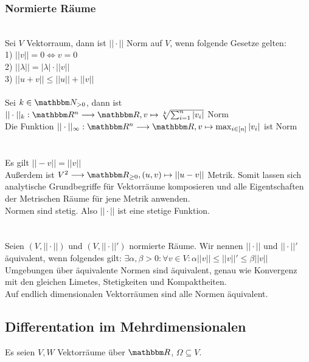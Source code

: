 \subsubsection*{Normierte Räume}
 \\
Sei \(V\) Vektorraum, dann ist \(||\cdot||\) Norm auf \(V\), wenn folgende Gesetze gelten:\\
1) \(||v|| = 0 \Longleftrightarrow v = 0\) \\
2) \(||\lambda|| = |\lambda| \cdot ||v||\) \\
3) \(||u+v|| \le ||u|| + ||v||\) \pagebreak \\
 \\
Sei \(k \in \N_{> 0}\), dann ist \(||\cdot||_k : \R^n \longrightarrow \R, v \mapsto \sqrt[k]{\sum_{i=1}^{n}|v_i|}\) Norm \\
Die Funktion \(||\cdot||_\infty : \R^n \longrightarrow \R, v \mapsto \max_{i \in [n]}|v_i|\) ist Norm \\ \\
 \\
Es gilt \(||-v|| = ||v||\) \\
Außerdem ist \(V^2 \longrightarrow \R_{\ge 0}, (u,v) \mapsto ||u-v||\) Metrik. Somit lassen sich analytische Grundbegriffe für Vektorräume komposieren und alle Eigentschaften der Metrischen Räume für jene Metrik anwenden. \\
Normen sind stetig. Also \(||\cdot||\) ist eine stetige Funktion. \\ \\
 \\
Seien \((V, ||\cdot||)\) und \((V, ||\cdot||')\) normierte Räume. Wir nennen \(||\cdot||\) und \(||\cdot||'\) äquivalent, wenn folgendes gilt: \(\exists \alpha,\beta > 0: \forall v \in V: \alpha ||v|| \le ||v||' \le \beta||v||\) \\
Umgebungen über äquivalente Normen sind äquivalent, genau wie Konvergenz mit den gleichen Limetes, Stetigkeiten und Kompaktheiten. \\
Auf endlich dimensionalen Vektorräumen sind alle Normen äquivalent.
\subsection*{Differentation im Mehrdimensionalen}
Es seien \(V, W\) Vektorräume über \(\R\), \(\Omega \subseteq V\).
